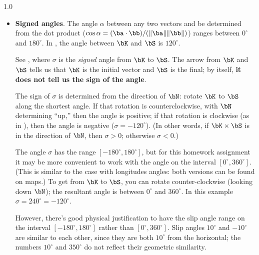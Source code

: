 \documentclass[11pt,titlepage,fleqn]{article}
\begin{document}
\begin{spacing}{1.0}
\begin{itemize}
\item {\bf Signed angles}.
The angle $\alpha$ between any two vectors and be determined from the dot product ($\cos\alpha = (\ba \cdot \bb) / (\|\ba\|\|\bb\|)$) ranges between $0^\circ$ and $180^\circ$. In , the angle between $\bK$ and $\bS$ is $120^\circ$.

See , where $\sigma$ is the {\em signed} angle from $\bK$ to $\bS$. The arrow from $\bK$ and $\bS$ tells us that $\bK$ is the initial vector and $\bS$ is the final; by itself, {\bf it does not tell us the sign of the angle}.

The sign of $\sigma$ is determined from the direction of $\bN$: rotate $\bK$ to $\bS$ along the shortest angle. If that rotation is counterclockwise, with $\bN$ determining ``up,'' then the angle is positive; if that rotation is clockwise (as in ), then the angle is negative ($\sigma = -120^\circ$). (In other words, if $\bK \times \bS$ is in the direction of $\bN$, then $\sigma > 0$; otherwise $\sigma < 0$.)

The angle $\sigma$ has the range $[-180^\circ, 180^\circ]$, but for this homework assignment it may be more convenient to work with the angle on the interval $[0^\circ, 360^\circ]$. (This is similar to the case with longitudes angles: both versions can be found on maps.) To get from $\bK$ to $\bS$, you can rotate counter-clockwise (looking down $\bN$); the resultant angle is between $0^\circ$ and $360^\circ$. In this example $\sigma = 240^\circ = -120^\circ$.

However, there's good physical justification to have the slip angle range on the interval $[-180^\circ, 180^\circ]$ rather than $[0^\circ, 360^\circ]$. Slip angles $10^\circ$ and $-10^\circ$ are similar to each other, since they are both $10^\circ$ from the horizontal; the numbers $10^\circ$ and $350^\circ$ do not reflect their geometric similarity.



\end{itemize}
\end{spacing}
\end{document}
